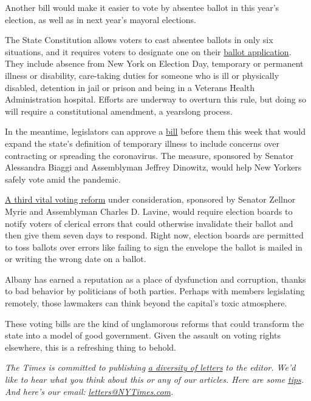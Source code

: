 Another bill would make it easier to vote by absentee ballot in this
year's election, as well as in next year's mayoral elections.

The State Constitution allows voters to cast absentee ballots in only
six situations, and it requires voters to designate one on their
\href{https://www.elections.ny.gov/NYSBOE/download/voting/AbsenteeBallot-English.pdf}{ballot
application}. They include absence from New York on Election Day,
temporary or permanent illness or disability, care-taking duties for
someone who is ill or physically disabled, detention in jail or prison
and being in a Veterans Health Administration hospital. Efforts are
underway to overturn this rule, but doing so will require a
constitutional amendment, a yearslong process.

In the meantime, legislators can approve a
\href{https://www.nysenate.gov/legislation/bills/2019/s8015/amendment/d}{bill}
before them this week that would expand the state's definition of
temporary illness to include concerns over contracting or spreading the
coronavirus. The measure, sponsored by Senator Alessandra Biaggi and
Assemblyman Jeffrey Dinowitz, would help New Yorkers safely vote amid
the pandemic.

\href{https://www.nysenate.gov/legislation/bills/2019/s8370/amendment/b}{A
third vital voting reform} under consideration, sponsored by Senator
Zellnor Myrie and Assemblyman Charles D. Lavine, would require election
boards to notify voters of clerical errors that could otherwise
invalidate their ballot and then give them seven days to respond. Right
now, election boards are permitted to toss ballots over errors like
failing to sign the envelope the ballot is mailed in or writing the
wrong date on a ballot.

Albany has earned a reputation as a place of dysfunction and corruption,
thanks to bad behavior by politicians of both parties. Perhaps with
members legislating remotely, those lawmakers can think beyond the
capital's toxic atmosphere.

These voting bills are the kind of unglamorous reforms that could
transform the state into a model of good government. Given the assault
on voting rights elsewhere, this is a refreshing thing to behold.

\emph{The Times is committed to publishing}
\href{https://www.nytimes3xbfgragh.onion/2019/01/31/opinion/letters/letters-to-editor-new-york-times-women.html}{\emph{a
diversity of letters}} \emph{to the editor. We'd like to hear what you
think about this or any of our articles. Here are some}
\href{https://help.nytimes3xbfgragh.onion/hc/en-us/articles/115014925288-How-to-submit-a-letter-to-the-editor}{\emph{tips}}\emph{.
And here's our email:}
\href{mailto:letters@NYTimes.com}{\emph{letters@NYTimes.com}}\emph{.}


